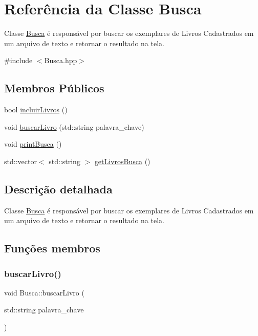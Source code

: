 \hypertarget{class_busca}{}\section{Referência da Classe Busca}
\label{class_busca}


Classe \mbox{\hyperlink{class_busca}{Busca}} é responsável por buscar os exemplares de Livros Cadastrados em um arquivo de texto e retornar o resultado na tela.  




{\ttfamily \#include $<$Busca.\+hpp$>$}

\subsection*{Membros Públicos}
\begin{DoxyCompactItemize}
\item 
bool \mbox{\hyperlink{class_busca_a73eadfa945ab7fa2cf92e4b0c70590bf}{incluir\+Livros}} ()
\item 
void \mbox{\hyperlink{class_busca_a53ac6cf49f256643144485a8cce6a29b}{buscar\+Livro}} (std\+::string palavra\+\_\+chave)
\item 
void \mbox{\hyperlink{class_busca_aa04fd71e97f268b784256fa71daaaccb}{print\+Busca}} ()
\item 
std\+::vector$<$ std\+::string $>$ \mbox{\hyperlink{class_busca_a5dfb95c0cc9de0a4490fbb56d6cc741f}{get\+Livros\+Busca}} ()
\end{DoxyCompactItemize}


\subsection{Descrição detalhada}
Classe \mbox{\hyperlink{class_busca}{Busca}} é responsável por buscar os exemplares de Livros Cadastrados em um arquivo de texto e retornar o resultado na tela. 

\subsection{Funções membros}
\mbox{\label{class_busca_a53ac6cf49f256643144485a8cce6a29b}} 
\subsubsection{\texorpdfstring{buscarLivro()}{buscarLivro()}}
{\footnotesize\ttfamily void Busca\+::buscar\+Livro (\begin{DoxyParamCaption}\item[{std\+::string}]{palavra\+\_\+chave }\end{DoxyParamCaption})}


